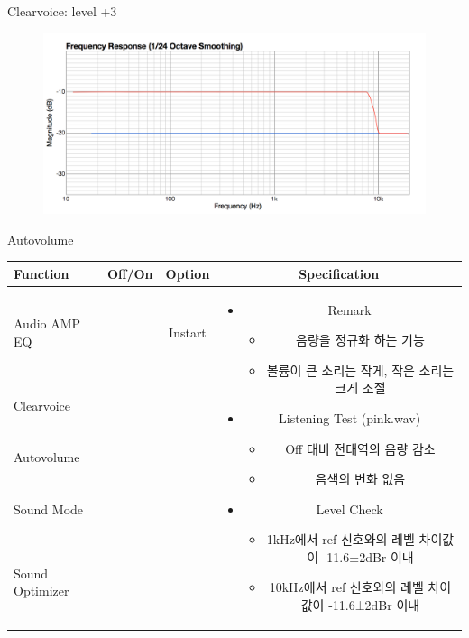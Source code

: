 \documentclass{beamer}
\begin{document}
\begin{frame}[t]{Clearvoice: level +3}
\begin{figure}[b]
\includegraphics[height=0.32\textwidth]{figure/cv3.png}
\end{figure}

\end{frame}


\begin{frame}[t]{Autovolume}
\begin{tiny}
\begin{tabular}{@{}lccc@{}}
\toprule
Function & Off/On & Option & Specification \\
\midrule
Audio AMP EQ & \color{black}{Off} & Instart &
\multirow{14}{60mm}{
\begin{itemize}
\item Remark
	\begin{itemize}
	\item 음량을 정규화 하는 기능
	\item 볼륨이 큰 소리는 작게, 작은 소리는 크게 조절
	\end{itemize}
\item Listening Test (pink.wav)
	\begin{itemize}
	\item Off 대비 전대역의 음량 감소
	\item 음색의 변화 없음
	\end{itemize}
\item Level Check
  \begin{itemize}
  \item 1kHz에서 ref 신호와의 레벨 차이값이 -11.6±2dBr 이내
  \item 10kHz에서 ref 신호와의 레벨 차이값이 -11.6±2dBr 이내
  \end{itemize}
\end{itemize}
} \\
Clearvoice & \color{black}{Off} & & \\
Autovolume & \color{blue}{On} & & \\
Sound Mode & \color{black}{Off} & & \\
Sound Optimizer & \color{black}{Off} & & \\

\end{tabular}
\end{tiny}
\end{frame}
\end{document}
